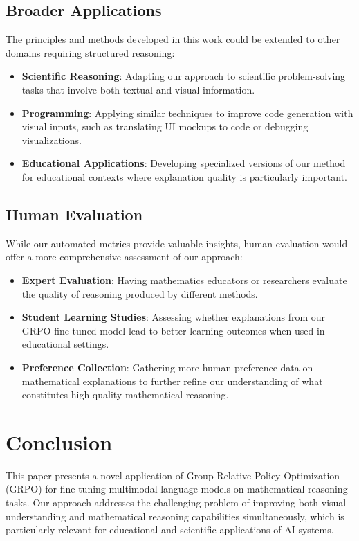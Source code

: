 \documentclass[11pt,a4paper]{article}
\begin{document}
\subsection{Broader Applications}

The principles and methods developed in this work could be extended to other domains requiring structured reasoning:

\begin{itemize}
    \item \textbf{Scientific Reasoning}: Adapting our approach to scientific problem-solving tasks that involve both textual and visual information.
    \item \textbf{Programming}: Applying similar techniques to improve code generation with visual inputs, such as translating UI mockups to code or debugging visualizations.
    \item \textbf{Educational Applications}: Developing specialized versions of our method for educational contexts where explanation quality is particularly important.
\end{itemize}

\subsection{Human Evaluation}

While our automated metrics provide valuable insights, human evaluation would offer a more comprehensive assessment of our approach:

\begin{itemize}
    \item \textbf{Expert Evaluation}: Having mathematics educators or researchers evaluate the quality of reasoning produced by different methods.
    \item \textbf{Student Learning Studies}: Assessing whether explanations from our GRPO-fine-tuned model lead to better learning outcomes when used in educational settings.
    \item \textbf{Preference Collection}: Gathering more human preference data on mathematical explanations to further refine our understanding of what constitutes high-quality mathematical reasoning.
\end{itemize}

\section{Conclusion}

This paper presents a novel application of Group Relative Policy Optimization (GRPO) for fine-tuning multimodal language models on mathematical reasoning tasks. Our approach addresses the challenging problem of improving both visual understanding and mathematical reasoning capabilities simultaneously, which is particularly relevant for educational and scientific applications of AI systems.
\end{document}
